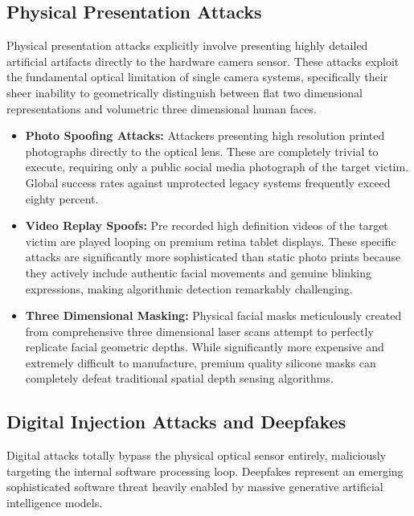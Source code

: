 \documentclass[12pt,a4paper]{report}
\begin{document}
\subsection{Physical Presentation Attacks}
Physical presentation attacks explicitly involve presenting highly detailed artificial artifacts directly to the hardware camera sensor. These attacks exploit the fundamental optical limitation of single camera systems, specifically their sheer inability to geometrically distinguish between flat two dimensional representations and volumetric three dimensional human faces. 

\begin{itemize}
    \item \textbf{Photo Spoofing Attacks:} Attackers presenting high resolution printed photographs directly to the optical lens. These are completely trivial to execute, requiring only a public social media photograph of the target victim. Global success rates against unprotected legacy systems frequently exceed eighty percent.
    \item \textbf{Video Replay Spoofs:} Pre recorded high definition videos of the target victim are played looping on premium retina tablet displays. These specific attacks are significantly more sophisticated than static photo prints because they actively include authentic facial movements and genuine blinking expressions, making algorithmic detection remarkably challenging.
    \item \textbf{Three Dimensional Masking:} Physical facial masks meticulously created from comprehensive three dimensional laser scans attempt to perfectly replicate facial geometric depths. While significantly more expensive and extremely difficult to manufacture, premium quality silicone masks can completely defeat traditional spatial depth sensing algorithms.
\end{itemize}

\subsection{Digital Injection Attacks and Deepfakes}
Digital attacks totally bypass the physical optical sensor entirely, maliciously targeting the internal software processing loop. Deepfakes represent an emerging sophisticated software threat heavily enabled by massive generative artificial intelligence models.
\end{document}
